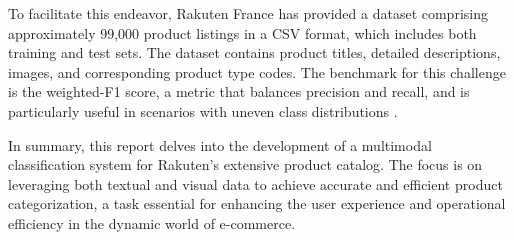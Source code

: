 To facilitate this endeavor, Rakuten France has provided a dataset comprising approximately 99,000 product listings in a CSV format, which includes both training and test sets. The dataset contains product titles, detailed descriptions, images, and corresponding product type codes. The benchmark for this challenge is the weighted-F1 score, a metric that balances precision and recall, and is particularly useful in scenarios with uneven class distributions \parencite{10.1093/mnrasl/slac120}.

In summary, this report delves into the development of a multimodal classification system for Rakuten's extensive product catalog. The focus is on leveraging both textual and visual data to achieve accurate and efficient product categorization, a task essential for enhancing the user experience and operational efficiency in the dynamic world of e-commerce.





